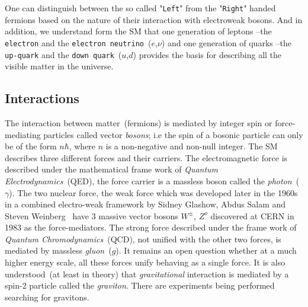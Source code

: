 
One can distinguish between the so called "\texttt{Left}" from the  "\texttt{Right}" handed fermions based on the nature of their interaction with electroweak bosons.  
And in addition, we understand form the SM that one generation of leptons --the \texttt{electron} and the \texttt{electron neutrino}~($e$,$\nu$) and one generation of quarks --the \texttt{up-quark} and the \texttt{down quark}~($u$,$d$) provides the basis for describing all the visible matter in the universe.
\subsection*{Interactions}
The interaction between matter~(fermions) is mediated by integer spin or force-mediating particles called vector \textit{bosons}; i.e the spin of a bosonic particle can only be of the form $n\hbar$, where $n$ is a non-negative and non-null integer. The SM describes three different forces and their carriers. The electromagnetic force is described under the mathematical frame work of \textit{Quantum Electrodynamics}~(QED), the force carrier is a massless boson called the \textit{photon}~($\gamma$). The two nuclear force, the weak force which was developed later in the 1960s in a combined electro-weak framework by Sidney Glashow, Abdus Salam and Steven Weinberg~\cite{SM} have 3 massive vector bosons $W^{\pm}$, $Z^{o}$ discovered at CERN in 1983 as the force-mediators. The strong force described under the frame work of \textit{Quantum Chromodynamics}~(QCD), not unified with the other two forces, is mediated by massless \textit{gluon}~($g$).  It remains an open question whether at a much higher energy scale, all these forces unify behaving as a single force. It is also understood~(at least in theory) that \textit{gravitational} interaction is mediated by a spin-2 particle called the \textit{graviton}. There are experiments being performed searching  for gravitons.



